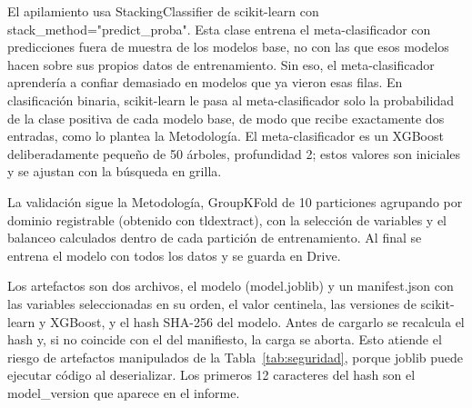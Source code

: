 El apilamiento usa StackingClassifier de scikit-learn con stack\_method="predict\_proba". Esta clase entrena el meta-clasificador con predicciones fuera de muestra de los modelos base, no con las que esos modelos hacen sobre sus propios datos de entrenamiento. Sin eso, el meta-clasificador aprendería a confiar demasiado en modelos que ya vieron esas filas. En clasificación binaria, scikit-learn le pasa al meta-clasificador solo la probabilidad de la clase positiva de cada modelo base, de modo que recibe exactamente dos entradas, como lo plantea la Metodología. El meta-clasificador es un XGBoost deliberadamente pequeño de 50 árboles, profundidad 2; estos valores son iniciales y se ajustan con la búsqueda en grilla. \newline

La validación sigue la Metodología, GroupKFold de 10 particiones agrupando por dominio registrable (obtenido con tldextract), con la selección de variables y el balanceo calculados dentro de cada partición de entrenamiento. Al final se entrena el modelo con todos los datos y se guarda en Drive. \newline

Los artefactos son dos archivos, el modelo (model.joblib) y un manifest.json con las variables seleccionadas en su orden, el valor centinela, las versiones de scikit-learn y XGBoost, y el hash SHA-256 del modelo. Antes de cargarlo se recalcula el hash y, si no coincide con el del manifiesto, la carga se aborta. Esto atiende el riesgo de artefactos manipulados de la Tabla~\ref{tab:seguridad}, porque joblib puede ejecutar código al deserializar. Los primeros 12 caracteres del hash son el model\_version que aparece en el informe. \newline

